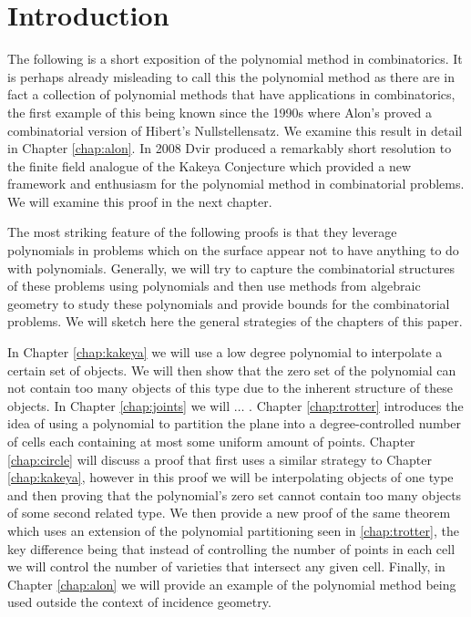 \chapter{Introduction}

The following is a short exposition of the polynomial method in combinatorics. 
It is perhaps already misleading to call this the polynomial method 
as there are in fact a collection of polynomial methods that have applications in combinatorics, the first example of this being known since the 1990s
where Alon's proved a combinatorial version of Hibert's Nullstellensatz.\cite{alon1999combinatorial} We examine this result in detail
in Chapter \ref{chap:alon}. In 2008 Dvir produced a remarkably short resolution to the finite field analogue of the Kakeya Conjecture which provided
a new framework and enthusiasm for the polynomial method in combinatorial problems.\cite{2008DVIR} We will examine this proof in the next chapter. 

The most striking feature of the following proofs is that they leverage polynomials in problems which on the surface appear not to have anything to 
do with polynomials. Generally, we will try to capture the combinatorial structures of these problems using polynomials and then use methods from algebraic
geometry to study these polynomials and provide bounds for the combinatorial problems.
We will sketch here the general strategies of the chapters of this paper.

In Chapter \ref{chap:kakeya} we will use a low degree polynomial to interpolate a certain set of objects. We will then show that the zero set of the polynomial can not contain 
too many objects of this type due to the inherent structure of these objects. In Chapter \ref{chap:joints} we will $\dots$ .
Chapter \ref{chap:trotter} introduces the idea of using a polynomial to partition the plane into a degree-controlled number of cells each containing at most some uniform amount of points.
Chapter \ref{chap:circle} will discuss a proof that first uses a similar strategy to Chapter \ref{chap:kakeya}, however in this proof we will be interpolating
objects of one type and then proving that the polynomial's zero set cannot contain too many objects of some second related type. 
We then provide a new proof of the same theorem which uses an extension of the polynomial partitioning seen in \ref{chap:trotter}, the key difference being that
instead of controlling the number of points in each cell we will control the number of varieties that intersect any given cell. Finally, in Chapter \ref{chap:alon} we will provide an example
of the polynomial method being used outside the context of incidence geometry.

